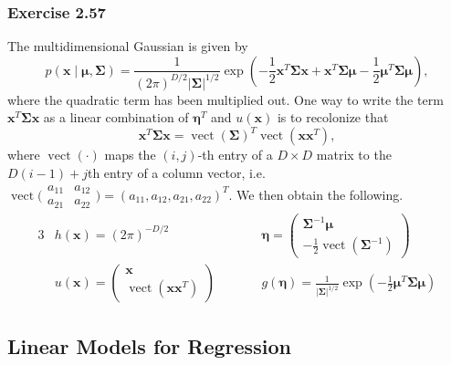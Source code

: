 \documentclass[12pt, a4paper]{article}
\newcommand{\vect}[1]{\bm{#1}}
\newcommand{\abs}[1]{\left\lvert#1\right\rvert}
\begin{document}
\subsubsection*{Exercise 2.57}
The multidimensional Gaussian is given by 
\begin{equation*}
	p\left(\vect{x} \mid \vect{\mu}, \vect{\Sigma} \right)
	= \frac{1}{(2 \pi )^{D /2} \abs{\vect{\Sigma}}^{1/2}}
	\exp \left( 
	-\frac{1}{2} \vect{x}^T \vect{\Sigma} \vect{x} 
	+ \vect{x}^T \vect{\Sigma} \vect{\mu}
	- \frac{1}{2} \vect{\mu}^T \vect{\Sigma} \vect{\mu}
	\right),
\end{equation*}
where the quadratic term has been multiplied out. 
One way to write the term $\vect{x}^T \vect{\Sigma} \vect{x}$ as a linear combination of $\vect{\eta}^T$ and $u(\vect{x})$ is to recolonize that
\begin{equation*}
	\vect{x}^T \vect{\Sigma} \vect{x} = 
	\operatorname{vect}\left( \vect{\Sigma} \right)^T 
	\operatorname{vect}\left( \vect{x} \vect{x}^T \right),
\end{equation*}
where $\operatorname{vect}\left( \cdot \right)$ maps the $(i,j)$-th entry of a $D \times D$ matrix to the $D(i-1) + j$th entry of a column vector, i.e. $\operatorname{vect} \bigl(\begin{smallmatrix}
a_{11} & a_{12} \\ 
a_{21} & a_{22}
\end{smallmatrix}\bigr)
= (a_{11}, a_{12}, a_{21}, a_{22})^T$.
We then obtain the following.
\begin{alignat*}{3}
	&h(\vect{x}) = (2 \pi)^{-D/2} 
	\qquad
	&&\vect{\eta} = 
		\begin{pmatrix}
		\vect{\Sigma}^{-1} \vect{\mu}
		\\ 
		- \frac{1}{2} \operatorname{vect}\left( \vect{\Sigma}^{-1} \right)
		\end{pmatrix} 
	\\
	&u(\vect{x}) = 
		\begin{pmatrix}
		\vect{x} \\ \operatorname{vect}\left(\vect{x} \vect{x}^T \right)
		\end{pmatrix} 
	\qquad
	&&g(\vect{\eta}) = 
	 \frac{1}{\abs{\vect{\Sigma}}^{1/2}}
	 \exp \left( 
	 - \frac{1}{2} \vect{\mu}^T \vect{\Sigma} \vect{\mu}
	 \right)
\end{alignat*}



\subsection{Linear Models for Regression}
\end{document}
